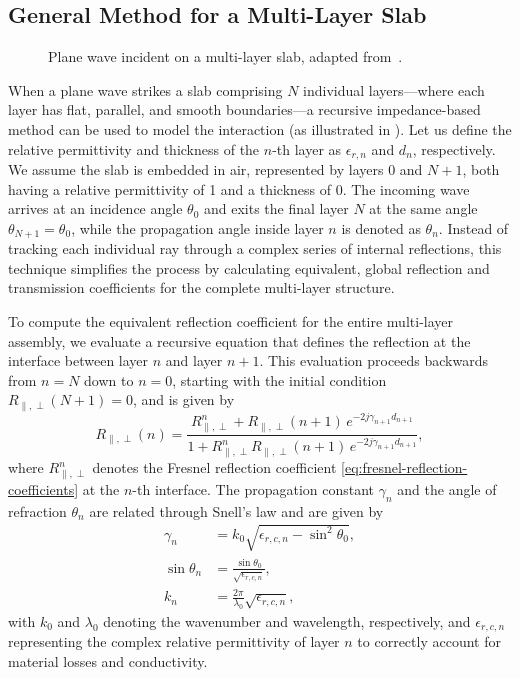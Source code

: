 \subsection{General Method for a Multi-Layer Slab}

\begin{figure}
  \centering
  \caption{Plane wave incident on a multi-layer slab, adapted from~\cite[Fig.~3]{ITU-R-P.2040}.}
\end{figure}

When a plane wave strikes a slab comprising $N$ individual layers---where each layer has flat, parallel, and smooth boundaries---a recursive impedance-based method can be used to model the interaction (as illustrated in ). Let us define the relative permittivity and thickness of the $n$-th layer as $\epsilon_{r,n}$ and $d_n$, respectively. We assume the slab is embedded in air, represented by layers $0$ and $N+1$, both having a relative permittivity of 1 and a thickness of 0. The incoming wave arrives at an incidence angle $\theta_0$ and exits the final layer $N$ at the same angle $\theta_{N+1} = \theta_0$, while the propagation angle inside layer $n$ is denoted as $\theta_n$. Instead of tracking each individual ray through a complex series of internal reflections, this technique simplifies the process by calculating equivalent, global reflection and transmission coefficients for the complete multi-layer structure.

To compute the equivalent reflection coefficient for the entire multi-layer assembly, we evaluate a recursive equation that defines the reflection at the interface between layer $n$ and layer $n+1$. This evaluation proceeds backwards from $n = N$ down to $n = 0$, starting with the initial condition $R_{\parallel,\perp}(N+1) = 0$, and is given by
\begin{equation}\label{eq:itu-reflection-recursive}
  R_{\parallel,\perp}(n) = \frac{R_{\parallel,\perp}^n + R_{\parallel,\perp}(n+1)\, e^{-2 j \gamma_{n+1} d_{n+1}}}{1 + R_{\parallel,\perp}^n R_{\parallel,\perp}(n+1)\,e^{-2 j \gamma_{n+1} d_{n+1}}},
\end{equation}
where $R_{\parallel,\perp}^n$ denotes the Fresnel reflection coefficient \eqref{eq:fresnel-reflection-coefficients} at the $n$-th interface. The propagation constant $\gamma_n$ and the angle of refraction $\theta_n$ are related through Snell's law and are given by
\begin{align}
  \gamma_n &= k_0 \sqrt{\epsilon_{r,c,n} - \sin^2\theta_0}, \\
  \sin\theta_n &= \frac{\sin\theta_0}{\sqrt{\epsilon_{r,c,n}}}, \\
  k_n &= \frac{2\pi}{\lambda_0} \sqrt{\epsilon_{r,c,n}},
\end{align}
with $k_0$ and $\lambda_0$ denoting the  \gls{wavenumber} and \gls{wavelength}, respectively, and $\epsilon_{r,c,n}$ representing the complex relative permittivity of layer $n$ to correctly account for material losses and conductivity.

